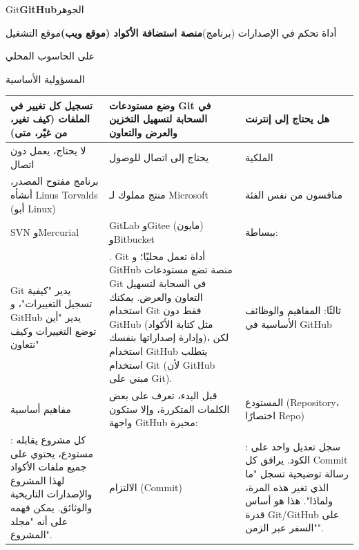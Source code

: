 


Git\textbf{GitHub}الجوهر

أداة تحكم في الإصدارات (برنامج)\textbf{منصة استضافة الأكواد (موقع ويب)}موقع التشغيل

على الحاسوب المحلي


المسؤولية الأساسية

\begin{center}
\begin{tabularx}{\linewidth}{|X|X|X|}
\hline
\textbf{تسجيل كل تغيير في الملفات (كيف تغير، من غيّر، متى)} & \textbf{وضع مستودعات Git في السحابة لتسهيل التخزين والعرض والتعاون} & \textbf{هل يحتاج إلى إنترنت} \tabularnewline
\hline
لا يحتاج، يعمل دون اتصال & يحتاج إلى اتصال للوصول & الملكية \tabularnewline
برنامج مفتوح المصدر، أنشأه Linus Torvalds (أبو Linux) & منتج مملوك لـ Microsoft & منافسون من نفس الفئة \tabularnewline
SVN وMercurial & GitLab وGitee (مايون) وBitbucket & ببساطة: \tabularnewline
Git يدير "كيفية تسجيل التغييرات"، و GitHub يدير "أين توضع التغييرات وكيف نتعاون" & . Git أداة تعمل محليًا؛ و GitHub منصة تضع مستودعات Git في السحابة لتسهيل التعاون والعرض. يمكنك استخدام Git فقط دون GitHub (مثل كتابة الأكواد وإدارة إصداراتها بنفسك)، لكن استخدام GitHub يتطلب استخدام Git (لأن GitHub مبني على Git). & ثالثًا: المفاهيم والوظائف الأساسية في GitHub \tabularnewline
مفاهيم أساسية & قبل البدء، تعرف على بعض الكلمات المتكررة، وإلا ستكون واجهة GitHub محيرة: & المستودع (Repository، اختصارًا Repo) \tabularnewline
: كل مشروع يقابله مستودع، يحتوي على جميع ملفات الأكواد لهذا المشروع والإصدارات التاريخية والوثائق. يمكن فهمه على أنه "مجلد المشروع". & الالتزام (Commit) & : سجل تعديل واحد على الكود. يرافق كل Commit رسالة توضيحية تسجل "ما الذي تغير هذه المرة، ولماذا". هذا هو أساس قدرة Git/GitHub على "السفر عبر الزمن". \tabularnewline
\hline
\end{tabularx}
\end{center}


